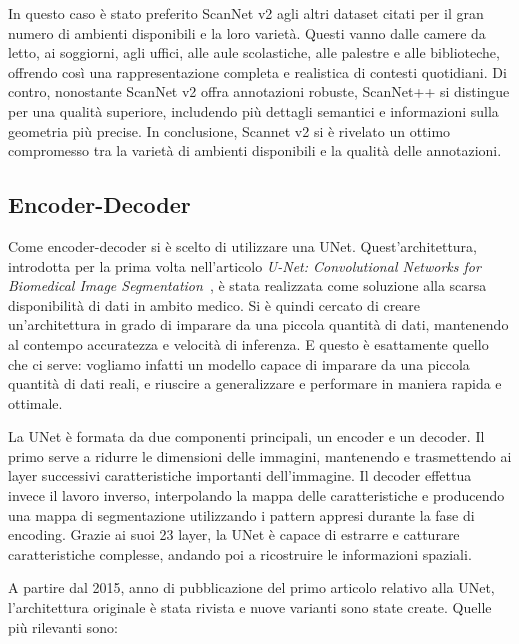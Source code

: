 \documentclass[12pt]{report}
\begin{document}
In questo caso è stato preferito ScanNet v2 agli altri dataset citati per il gran numero di ambienti disponibili e la loro varietà. Questi vanno dalle camere da letto, ai soggiorni, agli uffici, alle aule scolastiche, alle palestre e alle biblioteche, offrendo così una rappresentazione completa e realistica di contesti quotidiani. Di contro, nonostante ScanNet v2 offra annotazioni robuste, ScanNet++ si distingue per una qualità superiore, includendo più dettagli semantici e informazioni sulla geometria più precise. In conclusione, Scannet v2 si è rivelato un ottimo compromesso tra la varietà di ambienti disponibili e la qualità delle annotazioni.

\subsection{Encoder-Decoder}
\label{chap:encoder_decoder}

Come encoder-decoder si è scelto di utilizzare una UNet. Quest'architettura, introdotta per la prima volta nell'articolo \textit{U-Net: Convolutional Networks for Biomedical Image Segmentation}~\cite{ronneberger2015u}, è stata realizzata come soluzione alla scarsa disponibilità di dati in ambito medico. Si è quindi cercato di creare un'architettura in grado di imparare da una piccola quantità di dati, mantenendo al contempo accuratezza e velocità di inferenza. E questo è esattamente quello che ci serve: vogliamo infatti un modello capace di imparare da una piccola quantità di dati reali, e riuscire a generalizzare e performare in maniera rapida e ottimale. 

La UNet è formata da due componenti principali, un encoder e un decoder. Il primo serve a ridurre le dimensioni delle immagini, mantenendo e trasmettendo ai layer successivi caratteristiche importanti dell'immagine. Il decoder effettua invece il lavoro inverso, interpolando la mappa delle caratteristiche e producendo una mappa di segmentazione utilizzando i pattern appresi durante la fase di encoding. Grazie ai suoi 23 layer, la UNet è capace di estrarre e catturare caratteristiche complesse, andando poi a ricostruire le informazioni spaziali.

A partire dal 2015, anno di pubblicazione del primo articolo relativo alla UNet, l'architettura originale è stata rivista e nuove varianti sono state create. Quelle più rilevanti sono:
\end{document}
